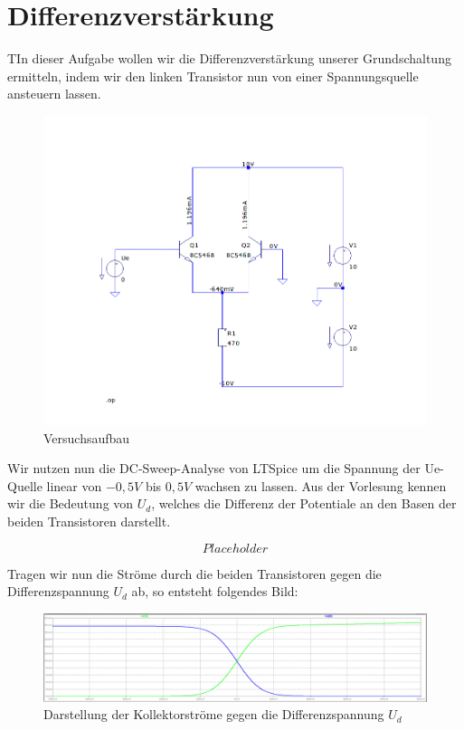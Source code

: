 \documentclass{article}
\begin{document}
\section{Differenzverstärkung}

\begin{task}
  TIn dieser Aufgabe wollen wir die Differenzverstärkung unserer Grundschaltung ermitteln, indem wir den linken Transistor nun von einer Spannungsquelle
  ansteuern lassen.
\end{task}

\begin{figure}[h]
  \centering
  \includegraphics[scale=0.5]{../assets/images/EL2P1/DeepinScreenshot_select-area_20210417230640.png}
  \caption{Versuchsaufbau}
  \label{fig:schalt2}
\end{figure}

Wir nutzen nun die DC-Sweep-Analyse von LTSpice um die Spannung der Ue-Quelle linear von $-0,5V$ bis $0,5V$
wachsen zu lassen. Aus der Vorlesung kennen wir die Bedeutung von $U_d$, welches die Differenz der
Potentiale an den Basen der beiden Transistoren darstellt. 

\begin{equation}
  Placeholder
\end{equation}

Tragen wir nun die Ströme durch die beiden Transistoren gegen die Differenzspannung $U_d$ ab, so
entsteht folgendes Bild:

\begin{figure}[h]
  \centering
  \includegraphics[scale=0.3]{../assets/images/EL2P1/DeepinScreenshot_select-area_20210417230438.png}
  \caption{Darstellung der Kollektorströme gegen die Differenzspannung $U_d$}
  \label{fig:diag1}
\end{figure}
\end{document}
